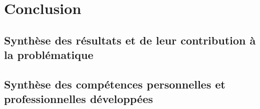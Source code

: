 \chapter{Conclusion}
\label{sec:conclusion}

\section{Synthèse des résultats et de leur contribution à la problématique}
    \lipsum[1-2]
    
\section{Synthèse des compétences personnelles et professionnelles développées}
    \lipsum[1-2]
    
